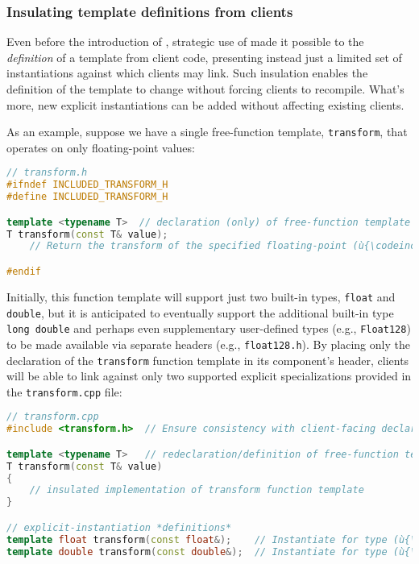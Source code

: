 \subsubsection[Insulating template definitions from clients]{Insulating template definitions from clients}\label{insulating-template-definitions-from-clients}

Even before the introduction of , strategic use of  made it possible to  the
\emph{definition} of a template from client code, presenting instead
just a limited set of instantiations against which clients may link.
Such insulation enables the definition of the template to change without
forcing clients to recompile. What's more, new explicit instantiations
can be added without affecting existing clients.

As an example, suppose we have a single free-function template,
\lstinline!transform!, that operates on only floating-point values:

\begin{lstlisting}[language=C++]
// transform.h
#ifndef INCLUDED_TRANSFORM_H
#define INCLUDED_TRANSFORM_H

template <typename T>  // declaration (only) of free-function template
T transform(const T& value);
    // Return the transform of the specified floating-point (ù{\codeincomments{value}}ù).

#endif
\end{lstlisting}
    
\noindent Initially, this function template will support just two built-in types,
\lstinline!float! and \lstinline!double!, but it is anticipated to eventually
support the additional built-in type \lstinline!long!~\lstinline!double! and
perhaps even supplementary user-defined types (e.g., \lstinline!Float128!)
to be made available via separate headers (e.g., \lstinline!float128.h!).
By placing only the declaration of the \lstinline!transform! function
template in its component's header, clients will be able to link against
only two supported explicit specializations provided in the
\lstinline!transform.cpp! file:

\begin{lstlisting}[language=C++]
// transform.cpp
#include <transform.h>  // Ensure consistency with client-facing declaration.

template <typename T>   // redeclaration/definition of free-function template
T transform(const T& value)
{
    // insulated implementation of transform function template
}

// explicit-instantiation *definitions*
template float transform(const float&);    // Instantiate for type (ù{\codeincomments{float}}ù).
template double transform(const double&);  // Instantiate for type (ù{\codeincomments{double}}ù).
\end{lstlisting}
    
